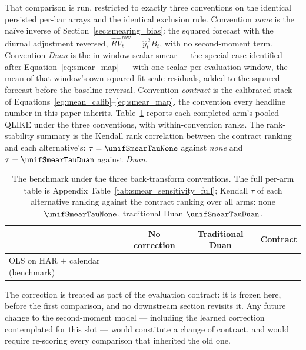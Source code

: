 That comparison is run, restricted to exactly three conventions on the
identical persisted per-bar arrays and the identical exclusion rule.
Convention \emph{none} is the na\"ive inverse of
Section~\ref{sec:smearing_bias}: the squared forecast with the diurnal
adjustment reversed, $\widehat{RV}_t^{\mathrm{raw}} = \hat{y}_t^{\,2} B_t$,
with no second-moment term. Convention \emph{Duan} is the in-window scalar
smear --- the \citet{Duan1983} special case identified after
Equation~\eqref{eq:smear_map} --- with one scalar per evaluation window,
the mean of that window's own squared fit-scale residuals, added to the
squared forecast before the baseline reversal. Convention \emph{contract}
is the calibrated stack of
Equations~\eqref{eq:mean_calib}--\eqref{eq:smear_map}, the convention
every headline number in this paper inherits.
Table~\ref{tab:smear_sensitivity} reports each completed arm's pooled
QLIKE under the three conventions, with within-convention ranks. The
rank-stability summary is the Kendall rank correlation between the
contract ranking and each alternative's:
$\tau = \unifSmearTauNone$ against \emph{none} and
$\tau = \unifSmearTauDuan$ against \emph{Duan}.

\begin{table}[H]
\centering
\caption{The benchmark under the three back-transform conventions. The
full per-arm table is Appendix Table~\ref{tab:smear_sensitivity_full};
Kendall $\tau$ of each alternative ranking against the contract ranking
over all arms: none $\unifSmearTauNone$, traditional Duan
$\unifSmearTauDuan$.}
\label{tab:smear_sensitivity}
\begin{tabular}{@{}lccc@{}}
\toprule
 & No correction & Traditional Duan & Contract \\
\midrule
OLS on HAR $+$ calendar (benchmark) & \unifAzeroQLIKENone{} & \unifAzeroQLIKEDuan{} & \unifAzeroQLIKE{} \\
\bottomrule
\end{tabular}
\end{table}

The correction is treated as part of the evaluation contract: it is frozen
here, before the first comparison, and no downstream section revisits it.
Any future change to the second-moment model --- including the learned
correction contemplated for this slot --- would constitute a change of
contract, and would require re-scoring every comparison that inherited the
old one.

